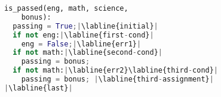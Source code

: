 \begin{lstlisting}[language=Python,escapechar=|]
is_passed(eng, math, science,
    bonus):
  passing = True;|\labline{initial}|
  if not eng:|\labline{first-cond}|
    eng = False;|\labline{err1}|
  if not math:|\labline{second-cond}|
    passing = bonus;
  if not math:|\labline{err2}\labline{third-cond}|
    passing = bonus; |\labline{third-assignment}|
|\labline{last}|
\end{lstlisting}
